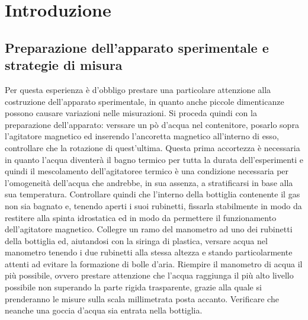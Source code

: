 \section{Introduzione}
\subsection{Preparazione dell'apparato sperimentale e strategie di misura}

Per questa esperienza è d'obbligo prestare una particolare attenzione alla costruzione dell'apparato sperimentale, in quanto anche piccole dimenticanze possono causare variazioni nelle misurazioni.
Si proceda quindi con la preparazione dell'apparato: verssare un pò d'acqua nel contenitore, posarlo sopra l'agitatore magnetico ed inserendo l'ancoretta magnetico all'interno di esso, controllare che la rotazione di quest'ultima.
Questa prima accortezza è necessaria in quanto l'acqua diventerà il bagno termico per tutta la durata dell'esperimenti e quindi il mescolamento dell'agitatoree termico è una condizione necessaria per l'omogeneità dell'acqua che andrebbe, in sua assenza, a stratificarsi in base alla sua temperatura.
Controllare quindi che l'interno della bottiglia contenente il gas non sia bagnato e, tenendo aperti i suoi rubinetti, fissarla stabilmente in modo da restitere alla spinta idrostatica ed in modo da permettere il funzionamento dell'agitatore magnetico.
Collegre un ramo del manometro ad uno dei rubinetti della bottiglia ed, aiutandosi con la siringa di plastica, versare acqua nel manometro tenendo i due rubinetti alla stessa altezza e stando particolarmente attenti ad evitare la formazione di bolle d'aria.
Riempire il manometro di acqua il più possibile, ovvero prestare attenzione che l'acqua raggiunga il più alto livello possibile non superando la parte rigida trasparente, grazie alla quale si prenderanno le misure sulla scala millimetrata posta accanto.
Verificare che neanche una goccia d'acqua sia entrata nella bottiglia.

